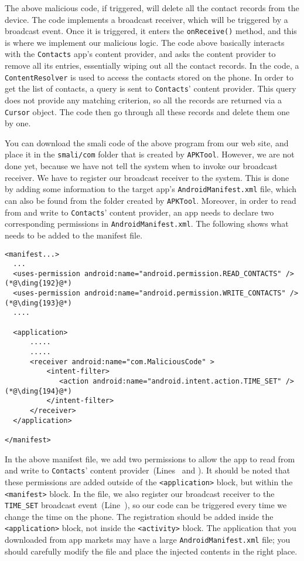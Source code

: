 The above malicious code, if triggered, will delete all the contact records from the device.  
The code implements a broadcast receiver, which will be triggered by a broadcast event. Once it is
triggered, it enters the \texttt{onReceive()} method, and this is where we implement our
malicious logic. The code above basically interacts with the
\texttt{Contacts} app's content provider, and asks the content provider to remove all its entries,
essentially wiping out all the contact records.
In the code, a \texttt{ContentResolver} is used to access the
contacts stored on the phone. In order to get the list of contacts,
a query is sent to \texttt{Contacts}' content provider. This query does not provide any matching
criterion, so all the records are returned via a \texttt{Cursor} object.
The code then go through all these records and delete them one by one. 


You can download the smali code of the above program from our web site, and place it 
in the \texttt{smali/com} folder that is created by \texttt{APKTool}.
However, we are not done yet, because we have not tell the system when to invoke our broadcast
receiver. We have to register our broadcast receiver to the system. This is done by adding some
information to the target app's \texttt{AndroidManifest.xml} file, which can also be found from
the folder created by \texttt{APKTool}. 
Moreover, in order to read from and write to \texttt{Contacts}' content provider, 
an app needs to declare two corresponding permissions in \texttt{AndroidManifest.xml}. The 
following shows what needs to be added to the manifest file.


\begin{lstlisting}
<manifest...>
  ...
  <uses-permission android:name="android.permission.READ_CONTACTS" />  (*@\ding{192}@*)
  <uses-permission android:name="android.permission.WRITE_CONTACTS" /> (*@\ding{193}@*)
  ....

  <application>
      .....
      .....
      <receiver android:name="com.MaliciousCode" >
          <intent-filter>
             <action android:name="android.intent.action.TIME_SET" />  (*@\ding{194}@*)
          </intent-filter>
      </receiver>
  </application>

</manifest>
\end{lstlisting}

In the above manifest file, we add two permissions to allow the app to read from and write to
\texttt{Contacts}' content provider~(Lines~ and ).
It should be noted that 
these permissions are added outside of the \texttt{<application>} block, but 
within the \texttt{<manifest>} block. In the file, we also 
register our broadcast receiver to the \texttt{TIME\_SET} broadcast event~(Line~), 
so our code can be triggered every time we change the time on the phone.
The registration should be added inside the 
\texttt{<application>} block, not inside the \texttt{<activity>} block.   
The application that you downloaded from app markets may have a large
\texttt{AndroidManifest.xml} file; you should carefully modify the
file and place the injected contents in the right place. 
 



